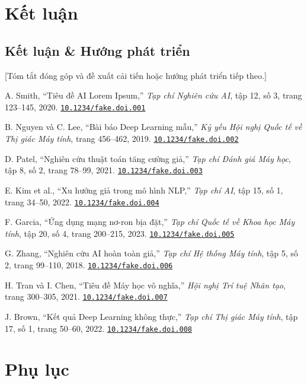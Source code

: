 \documentclass[a4paper]{book}
\newcommand{\doi}[1]{\href{https://doi.org/#1}{\texttt{#1}}} %
\begin{document}
\chapter{Kết luận}

\section{Kết luận \& Hướng phát triển}
[Tóm tắt đóng góp và đề xuất cải tiến hoặc hướng phát triển tiếp theo.]

\begin{thebibliography}{9}
 A. Smith, ``Tiêu đề AI Lorem Ipsum,'' \emph{Tạp chí Nghiên cứu AI}, tập 12, số 3, trang 123--145, 2020. \doi{10.1234/fake.doi.001}

 B. Nguyen và C. Lee, ``Bài báo Deep Learning mẫu,'' \emph{Kỷ yếu Hội nghị Quốc tế về Thị giác Máy tính}, trang 456--462, 2019. \doi{10.1234/fake.doi.002}

 D. Patel, ``Nghiên cứu thuật toán tăng cường giả,'' \emph{Tạp chí Đánh giá Máy học}, tập 8, số 2, trang 78--99, 2021. \doi{10.1234/fake.doi.003}

 E. Kim et al., ``Xu hướng giả trong mô hình NLP,'' \emph{Tạp chí AI}, tập 15, số 1, trang 34--50, 2022. \doi{10.1234/fake.doi.004}

 F. Garcia, ``Ứng dụng mạng nơ-ron bịa đặt,'' \emph{Tạp chí Quốc tế về Khoa học Máy tính}, tập 20, số 4, trang 200--215, 2023. \doi{10.1234/fake.doi.005}

 G. Zhang, ``Nghiên cứu AI hoàn toàn giả,'' \emph{Tạp chí Hệ thống Máy tính}, tập 5, số 2, trang 99--110, 2018. \doi{10.1234/fake.doi.006}

 H. Tran và I. Chen, ``Tiêu đề Máy học vô nghĩa,'' \emph{Hội nghị Trí tuệ Nhân tạo}, trang 300--305, 2021. \doi{10.1234/fake.doi.007}

 J. Brown, ``Kết quả Deep Learning không thực,'' \emph{Tạp chí Thị giác Máy tính}, tập 17, số 1, trang 50--60, 2022. \doi{10.1234/fake.doi.008}
\end{thebibliography}

\appendix
\chapter{Phụ lục}
\end{document}
